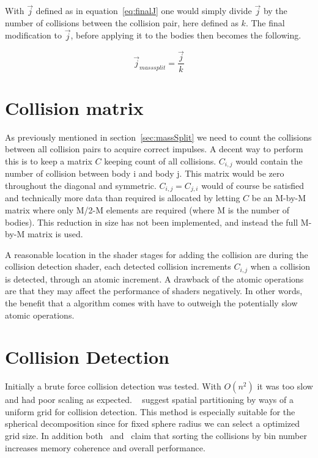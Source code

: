 With $\vec{j}$ defined as in equation~\ref{eq:finalJ} one would simply divide $\vec{j}$ by
the number of collisions between the collision pair, here defined as $k$. The final modification to
$\vec{j}$, before applying it to the bodies then becomes the following.

\begin{equation}
  \vec{j}_{mass split} = \frac{\vec{j}}{k}
\end{equation}

\section{Collision matrix}\label{sec:colMatrix}
As previously mentioned in section~\ref{sec:massSplit} we need to count the collisions
between all collision pairs to acquire correct impulses. A decent way to perform
this is to keep a matrix $C$ keeping count of all collisions. $C_{i,j}$ would
contain the number of collision between body i and body j. This matrix would be
zero throughout the diagonal and symmetric. $C_{i,j} = C_{j,i}$ would of course
be satisfied and technically more data than required is allocated by letting $C$
be an M-by-M matrix where only M/2-M elements are required (where M is the
number of bodies). This reduction in size
has not been implemented, and instead the full M-by-M matrix is used.

A reasonable location in the shader stages for adding the collision are during
the collision detection shader, each detected collision increments $C_{i,j}$
when a collision is detected, through an atomic increment. A drawback of the atomic
 operations are that they may affect the performance of shaders negatively. In
 other words, the benefit that a algorithm comes with have to outweigh the potentially
 slow atomic operations.

\section{Collision Detection}
Initially a brute force collision detection was tested. With $O(n^2)$ it was too
slow and had poor scaling as expected. ~\cite{gpugems} suggest spatial partitioning
by ways of a uniform grid for collision detection. This method is especially suitable
for the spherical decomposition since for fixed sphere radius we can select a optimized
grid size. In addition both~\cite{gpugems} and~\cite{fastnearest} claim that sorting
the collisions by bin number increases memory coherence and overall performance.

